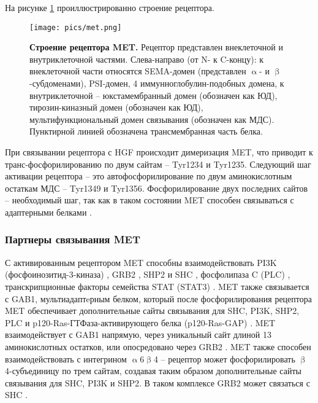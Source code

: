 На рисунке \ref{figure:met} проиллюстрированно строение рецептора.

\begin{figure}[h]
	\centering
	\texttt{[image: pics/met.png]}
	\caption{\textbf{Строение рецептора MET.}
	Рецептор представлен внеклеточной и внутриклеточной частями. Слева-направо (от N- к C-концу): к внеклеточной части относятся SEMA-домен (представлен $\upalpha$- и $\upbeta$-субдоменами), PSI-домен, 4 иммунноглобулин-подобных домена, к внутриклеточной -- юкстамембранный домен (обозначен как ЮД), тирозин-киназный домен (обозначен как ЮД), мультифункциональный домен связывания (обозначен как МДС). Пунктирной линией обозначена трансмембранная часть белка.}
	\label{figure:met}
\end{figure}

При связывании рецептора с HGF происходит димеризация MET, что приводит к транс-фосфорилированию по двум сайтам -- Tyr1234 и Tyr1235. Следующий шаг активации рецептора -- это автофосфорилирование по двум аминокислотным остаткам МДС -- Tyr1349 и Tyr1356. Фосфорилирование двух последних сайтов -- необходимый шаг, так как в таком состоянии MET способен связываться с адаптерными белками \cite{trusolino_met_2010}.

\subsubsection{Партнеры связывания MET}

С активированным рецептором MET способны взаимодействовать PI3K (фосфоинозитид-3-киназа) \cite{ponzetto_multifunctional_1994}, GRB2  \cite{ponzetto_multifunctional_1994}, SHP2 \cite{fixman_pathways_1996} и SHC \cite{fixman_pathways_1996}, фосфолипаза C (PLC) \cite{ponzetto_multifunctional_1994}, транскрипционные факторы семейства STAT (STAT3) \cite{zhang_requirement_2002}. MET также связывается с  GAB1, мультиадаптeрным белком, который после фосфорилирования рецептора MET обеспечивает дополнительные сайты связывания для SHC, PI3K, SHP2, PLC и p120-Ras-ГТФаза-активирующего белка (p120-Ras-GAP) \cite{trusolino_met_2010}. MET взаимодействует с GAB1 напрямую, через уникальный сайт длиной 13 аминокислотных остатков, или опосредовано через GRB2 \cite{schaeper_coupling_2000, lock_identification_2000}. MET также способен взаимодействовать с интегрином $\upalpha$6$\upbeta$4 – рецептор может фосфорилировать $\upbeta$4-субъединицу по трем сайтам, создавая таким образом дополнительные сайты связывания для SHC, PI3K и SHP2. В таком комплексе GRB2 может связаться с SHC \cite{trusolino_met_2010}.

